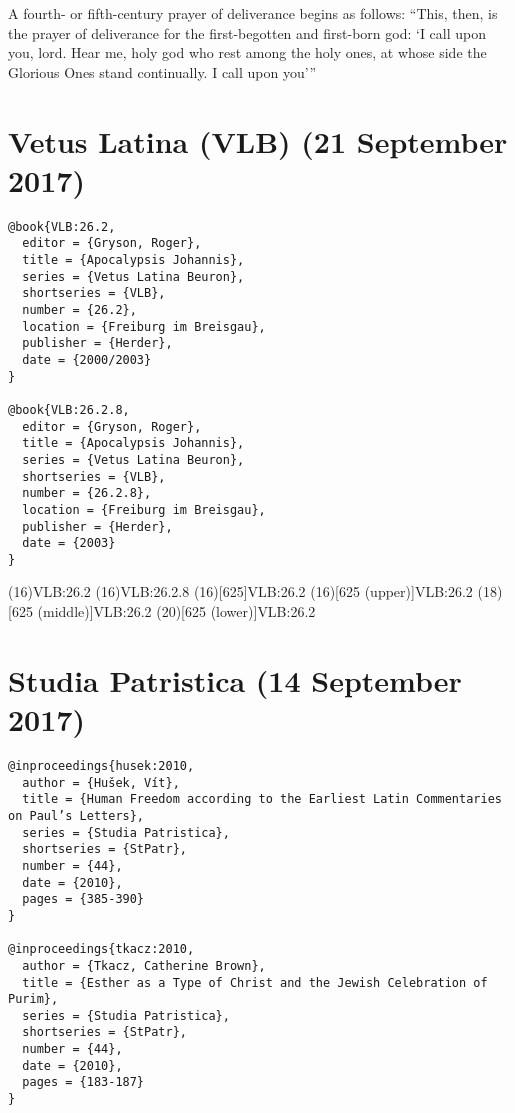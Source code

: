 \documentclass[a4paper]{article}
\begin{document}
\begin{verbcite}
  A fourth- or fifth-century prayer of deliverance begins as follows: “This,
  then, is the prayer of deliverance for the first-begotten and first-born
  god: ‘I call upon you, lord. Hear me, holy god who rest among the holy ones,
  at whose side the Glorious Ones stand continually. I call upon you’”
  \parencite[( \mkbibbrackets{O'Neil in Betz})]{PGM}
\end{verbcite}
\nocite{preisendaz:1973-1974}
\exampleabbreviations
\examplebibliography
{}

\section{Vetus Latina (VLB) (21 September 2017)}

\begin{verbatim}
@book{VLB:26.2,
  editor = {Gryson, Roger},
  title = {Apocalypsis Johannis},
  series = {Vetus Latina Beuron},
  shortseries = {VLB},
  number = {26.2},
  location = {Freiburg im Breisgau},
  publisher = {Herder},
  date = {2000/2003}
}

@book{VLB:26.2.8,
  editor = {Gryson, Roger},
  title = {Apocalypsis Johannis},
  series = {Vetus Latina Beuron},
  shortseries = {VLB},
  number = {26.2.8},
  location = {Freiburg im Breisgau},
  publisher = {Herder},
  date = {2003}
}
\end{verbatim}

\examplecite(16){VLB:26.2}
\examplecite(16){VLB:26.2.8}
\citereset
\examplecite(16)[625]{VLB:26.2}
\citereset
\examplecite(16)[625 \mkbibparens{upper}]{VLB:26.2}
\examplecite(18)[625 \mkbibparens{middle}]{VLB:26.2}
\examplecite(20)[625 \mkbibparens{lower}]{VLB:26.2}
\exampleabbreviations
\examplebibliography
{}

\section{Studia Patristica (14 September 2017)}

\begin{verbatim}
@inproceedings{husek:2010,
  author = {Hušek, Vít},
  title = {Human Freedom according to the Earliest Latin Commentaries on Paul’s Letters},
  series = {Studia Patristica},
  shortseries = {StPatr},
  number = {44},
  date = {2010},
  pages = {385-390}
}

@inproceedings{tkacz:2010,
  author = {Tkacz, Catherine Brown},
  title = {Esther as a Type of Christ and the Jewish Celebration of Purim},
  series = {Studia Patristica},
  shortseries = {StPatr},
  number = {44},
  date = {2010},
  pages = {183-187}
}
\end{verbatim}
\end{document}
